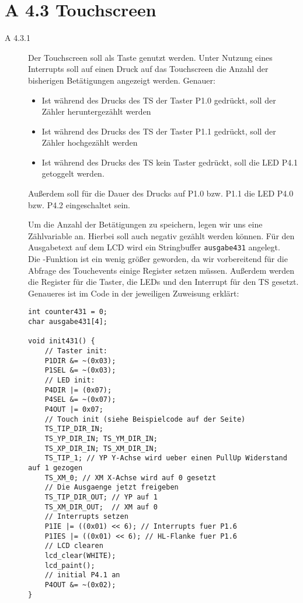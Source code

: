 \documentclass[11pt,a4paper,ngerman]{article}
\begin{document}
\section*{A 4.3 Touchscreen}
\begin{description}
\item[A 4.3.1] Der Touchscreen soll als Taste genutzt werden. Unter Nutzung eines Interrupts soll auf einen Druck auf das Touchscreen die Anzahl der bisherigen Betätigungen angezeigt werden. Genauer:
\begin{itemize}
\item Ist während des Drucks des TS der Taster P1.0 gedrückt, soll der Zähler heruntergezählt werden 
\item Ist während des Drucks des TS der Taster P1.1 gedrückt, soll der Zähler hochgezählt werden
\item Ist während des Drucks des TS kein Taster gedrückt, soll die LED P4.1 getoggelt werden.
\end{itemize} 
Außerdem soll für die Dauer des Drucks auf P1.0 bzw. P1.1 die LED P4.0 bzw. P4.2 eingeschaltet sein.

Um die Anzahl der Betätigungen zu speichern, legen wir uns eine Zählvariable an. Hierbei soll auch negativ gezählt werden können. Für den Ausgabetext auf dem LCD wird ein Stringbuffer \texttt{ausgabe431} angelegt. \\
Die -Funktion ist ein wenig größer geworden, da wir vorbereitend für die Abfrage des Touchevents einige Register setzen müssen. Außerdem werden die Register für die Taster, die LEDs und den Interrupt für den TS gesetzt. Genaueres ist im Code in der jeweiligen Zuweisung erklärt:

\begin{lstlisting}
int counter431 = 0;
char ausgabe431[4];

void init431() {
	// Taster init:
	P1DIR &= ~(0x03);
	P1SEL &= ~(0x03);
	// LED init:
	P4DIR |= (0x07);
	P4SEL &= ~(0x07);
	P4OUT |= 0x07;
	// Touch init (siehe Beispielcode auf der Seite)
	TS_TIP_DIR_IN;
	TS_YP_DIR_IN; TS_YM_DIR_IN;
	TS_XP_DIR_IN; TS_XM_DIR_IN; 
	TS_TIP_1; // YP Y-Achse wird ueber einen PullUp Widerstand auf 1 gezogen
	TS_XM_0; // XM X-Achse wird auf 0 gesetzt
	// Die Ausgaenge jetzt freigeben
	TS_TIP_DIR_OUT; // YP auf 1
	TS_XM_DIR_OUT;  // XM auf 0
	// Interrupts setzen
	P1IE |= ((0x01) << 6); // Interrupts fuer P1.6
	P1IES |= ((0x01) << 6); // HL-Flanke fuer P1.6
	// LCD clearen
	lcd_clear(WHITE);
	lcd_paint();
	// initial P4.1 an
	P4OUT &= ~(0x02);
}
\end{lstlisting}


\end{description}
\end{document}
